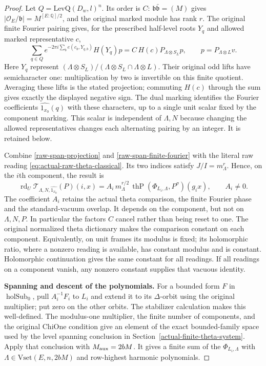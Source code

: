\begin{proof}
Let $Q=\mathrm{LevQ}(D_w,l)^n$. Its order is $C$:
$\mathfrak b\bar{\mathfrak b}=(M)$ gives
$|\mathcal O_E/\mathfrak b|=M^{[E:\mathbb Q]/2}$,
and the original marked module has rank $r$.
The original finite Fourier pairing gives, for the prescribed
half-level roots $Y_q$ and allowed marked representative $c$,
\begin{equation}\label{raw-span-finite-fourier}
 \sum_{q\in Q}e^{-2\pi i\sum_b e(c_b,Y_{q,b})}
                   H(Y_q)p
       =C\,H(c)P_{\Lambda\otimes S_L}p,
 \qquad p=P_{\Lambda\otimes L}v.
\end{equation}
Here $Y_q$ represent
$(\Lambda\otimes S_L)/(\Lambda\otimes S_L\cap
\Lambda\otimes L)$. Their original odd lifts have
semicharacter one: multiplication by two is invertible on this
finite quotient. Averaging these lifts is the stated projection;
commuting $H(c)$ through the sum gives exactly the displayed
negative sign. The dual marking identifies the Fourier
coefficients $\widehat{1_{x_0}}(q)$ with these characters, up
to a single unit scalar fixed by the component marking. This
scalar is independent of $\Lambda,N$ because changing the
allowed representatives changes each alternating pairing by an
integer. It is retained below.

Combine \eqref{raw-span-projection} and
\eqref{raw-span-finite-fourier} with the literal raw reading
\eqref{eq:actual-raw-theta-classical}. Its two indices satisfy
$J/I=m_\Lambda^r$. Hence, on the $i$th component, the result is
\begin{equation}\label{raw-span-reading}
 \operatorname{rd}_U\mathcal T_{\Lambda,N,
          \widehat{1_{x_0}}}(P)(i,x)
   =A_i\,m_\Lambda^{r/2}\,
         \operatorname{thP}(\Phi_{L_i,\Lambda},P^\sigma)(g_i x),
                \qquad A_i\ne0.
\end{equation}
The coefficient $A_i$ retains the actual theta comparison,
the finite Fourier phase and the standard-vacuum overlap.
It depends on the component, but not on $\Lambda,N,P$.
In particular the factors $C$ cancel rather than being reset
to one. The original normalized theta dictionary makes the
comparison constant on each component. Equivalently, on unit
frames its modulus is fixed; its holomorphic ratio, where a
nonzero reading is available, has constant modulus and is
constant. Holomorphic continuation gives the same constant
for all readings. If all readings on a component vanish,
any nonzero constant supplies that vacuous identity.

\textbf{Spanning and descent of the polynomials.}
For a bounded form $F$ in $\operatorname{holSub}_0$, pull
$A_i^{-1}F_i$ to $L_i$ and extend it to its $\Delta$-orbit
using the original multiplier; put zero on the other orbits.
The stabilizer calculation makes this well-defined.
The modulus-one multiplier, the finite number of components,
and the original $\mathrm{ChiOne}$ condition give an element
of the exact bounded-family space used by the level spanning
conclusion in Section~\ref{actual-finite-theta-system}.
Apply that conclusion with $M_{\rm aux}=2bM$.
It gives a finite sum of the $\Phi_{L_i,\Lambda}$ with
$\Lambda\in\mathrm{Vset}(E,n,2bM)$ and row-highest harmonic
polynomials.


\end{proof}
